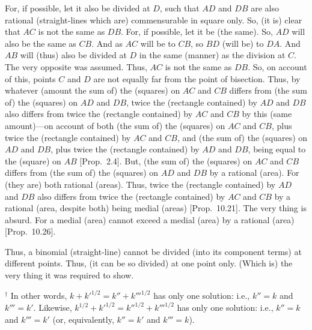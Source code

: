 \begin{Parallel}{}{}
{For, if possible, let it also be divided at $D$, such that $AD$ and
$DB$ are also rational (straight-lines which are) commensurable in
square only. So, (it is) clear that $AC$ is not the same as $DB$.
For, if possible, let it be (the same). So, $AD$ will also be the same
as $CB$. And as $AC$ will be to $CB$, so $BD$ (will be) to $DA$.
And $AB$ will (thus) also be divided at $D$ in the same (manner) as the division at $C$. The very opposite was assumed. Thus, $AC$ is not the
same as $DB$. So, on account of this,  points $C$ and $D$ are
not equally far from the point of bisection. Thus, by whatever (amount the sum of) the (squares) on $AC$ and $CB$ differs from (the sum of) the
(squares) on $AD$ and $DB$, twice the (rectangle contained)
by $AD$ and $DB$ also differs from twice the (rectangle contained)
by $AC$ and $CB$ by this (same amount)---on account of both (the sum of) the (squares) on $AC$ and
$CB$, plus twice the (rectangle contained) by $AC$ and $CB$, and
(the sum of) the (squares) on $AD$ and $DB$, plus twice the
(rectangle contained) by $AD$ and $DB$,  being equal to the (square) on $AB$ [Prop.~2.4]. But, (the sum of) the
(squares) on  $AC$ and $CB$ differs from (the sum of) the (squares)
on $AD$ and $DB$ by a rational (area). For (they are) both rational (areas).
Thus, twice the (rectangle contained) by $AD$ and $DB$ also differs from
twice the (rectangle contained) by $AC$ and $CB$ by a
rational (area, despite both) being medial (areas) [Prop.~10.21]. The very thing is absurd. For a
medial (area) cannot exceed a medial (area) by a rational (area) [Prop.~10.26].

Thus, a binomial (straight-line) cannot be divided (into its component terms) at different points.
Thus, (it can be so divided) at one point only. (Which is) the very thing it
was required to show.}
\end{Parallel}
{\footnotesize\noindent$^\dag$ In other words, $k + k'^{1/2} = k'' + k'''^{1/2}$
has only one solution: {i.e.}, $k''=k$ and $k'''=k'$. Likewise,
$k^{1/2} + k'^{1/2} = k''^{1/2}+ k'''^{1/2}$ has only one solution:
{i.e.}, $k''=k$ and $k'''=k'$ (or, equivalently, $k''=k'$ and $k'''=k$).}

